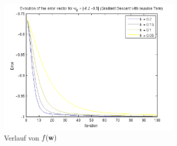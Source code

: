 \begin{figure}[h!]
  \centering
  \includegraphics[width=0.8\textwidth]{./figures/212/error_w02.png}
  \caption{Verlauf von $f(\mathbf{w})$}
  \label{fig:impulse_error_w02}
\end{figure}
